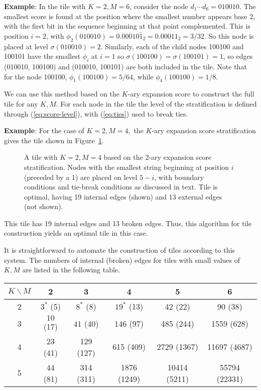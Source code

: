 \documentclass[12pt]{article}
\begin{document}
\vspace*{0.1in}

\noindent
{\bf Example}: In the tile with $K = 2, M = 6$, consider the node $d_1
\cdots d_6 = 010010$.  The smallest score is found at the position
where the smallest number appears base 2, with the first bit in the
sequence beginning at that point complemented.  This is position $i =
2$, with $\phi_2 (010010)= 0.00010\bar{1}_2 = 0.00011_2 = 3/32$.  So
this node is placed at level $\sigma (010010) = 2$.  Similarly, each
of the child nodes 100100 and 100101 have the smallest $\phi_i$ at $i
= 1$ so $\sigma (100100) = \sigma (100101) = 1$, so edges (010010,
100100) and (010010, 100101) are both included in the tile.  Note that
for the node 100100, $\phi_1 (100100) = 5/64$, while $\phi_4 (100100)
= 1/8$.

We can use this method based on the $K$-ary expansion
score to construct the full tile for any $K, M$.   For each node in
the tile the level of the stratification is defined through
(\ref{eq:score-level}), with (\ref{eq:ties}) used to break ties.
\vspace*{0.1in}

\noindent
{\bf Example}: For the case of $K = 2, M = 4,$ the $K$-ary expansion
score stratification gives the tile shown in Figure~\ref{f:tile-24}.
\begin{figure}
\begin{center}
\end{center}
\caption[x]{\footnotesize A tile with $K = 2, M = 4$ based on the
2-ary expansion score stratification.  Nodes with the smallest string
beginning at position $i$ (preceded by a 1) are placed on level $5-i$,
with boundary conditions and tie-break conditions as discussed in
text.
Tile is optimal, having 19 internal edges (shown) and 13 external edges (not shown).}
\label{f:tile-24}
\end{figure}
This tile has 19 internal edges and 13 broken edges.  Thus, this
algorithm for tile construction yields an optimal tile in this case.
\vspace*{0.1in}

It is straightforward to automate the construction of tiles according
to this system.  The numbers of internal (broken) edges for tiles with
small values of $K, M$ are listed in the following table.

\begin{center}
\begin{tabular}{|| c  || c | c | c | c |c  ||}
\hline
\hline
$K\backslash M$ & 2 & 3 & 4 & 5 & 6\\
\hline
\hline
2 & $3^*$ (5) & $8^*$ (8) & $19^*$ (13) & 42 (22) & $90$ (38)\\
3 & $10$ (17) & $41$ (40) & $146$ (97) & 485 (244) & 1559 (628)\\
4 & 23 (41) & 129 (127) & 615 (409) & 2729 (1367) & 11697 (4687)\\
5 & 44 (81) & 314 (311) & 1876 (1249) & 10414 (5211) & 55794 (22331)\\
\hline
\hline
\end{tabular}
\end{center}
\end{document}
